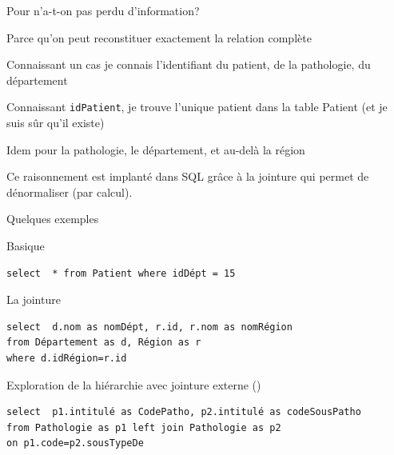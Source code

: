 \begin{frame}{Pour n'a-t-on pas perdu d'information?}
 
Parce qu'on peut reconstituer \alert{exactement} la relation complète
\vfill

    
\begin{redbullet}
  \item Connaissant un cas je connais l'identifiant du patient, 
     de la pathologie, du département
 \item Connaissant \texttt{idPatient}, je trouve l'unique patient 
     dans la table Patient (et je suis sûr qu'il existe)
     \item  Idem pour la pathologie, le département, et au-delà la région
\end{redbullet}

\vfill


Ce raisonnement est implanté dans SQL grâce à la \alert{jointure}
qui permet de \alert{dénormaliser} (par calcul). 

\end{frame}


\begin{frame}[fragile]{Quelques exemples}
 
Basique

\begin{verbatim}
select  * from Patient where idDépt = 15
\end{verbatim}

\vfill

La jointure

\begin{verbatim}
select  d.nom as nomDépt, r.id, r.nom as nomRégion 
from Département as d, Région as r
where d.idRégion=r.id
\end{verbatim}

\vfill

Exploration de la hiérarchie avec jointure externe ()

\begin{verbatim}
select  p1.intitulé as CodePatho, p2.intitulé as codeSousPatho
from Pathologie as p1 left join Pathologie as p2
on p1.code=p2.sousTypeDe
\end{verbatim}

\end{frame}


